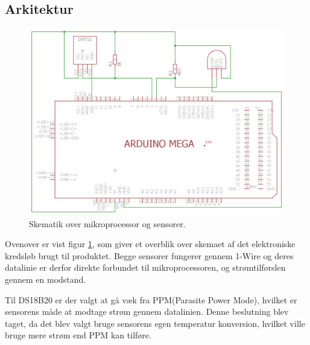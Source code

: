 \subsection{Arkitektur}

\begin{figure}[h!]
 \centering
 \includegraphics[width=1\textwidth]{figures/phase1_schematic.png}
 \caption{Skematik over mikroprocessor og sensorer.}
 \label{p1_skema}
\end{figure}

Ovenover er vist figur \ref{p1_skema}, som giver et overblik over skemaet af det elektroniske kredsløb brugt til produktet.
Begge sensorer fungerer gennem 1-Wire og deres datalinie er derfor direkte forbundet til mikroprocessoren, og strømtilførslen gennem en modstand.

Til DS18B20 er der valgt at gå væk fra PPM(Parasite Power Mode), hvilket er sensorens måde at modtage strøm gennem datalinien. Denne beslutning blev taget, da det blev valgt bruge sensorens egen temperatur konversion, hvilket ville bruge mere strøm end PPM kan tilføre.
